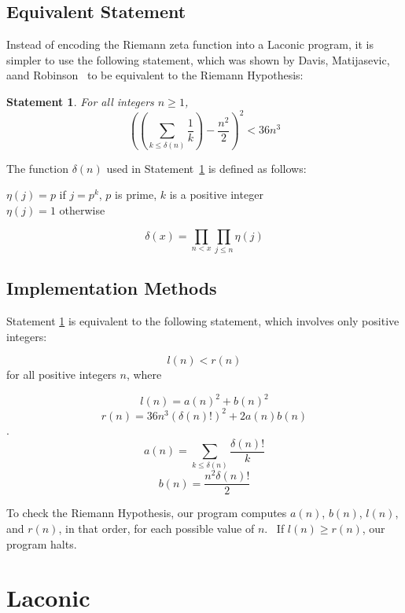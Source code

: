 \documentclass[11pt]{article}
\newtheorem{statement}{Statement}
\newenvironment{nscenter}
 {\parskip=0pt\par\nopagebreak\centering}
 {\par\noindent\ignorespacesafterend}
\begin{document}
\subsection{Equivalent Statement}

Instead of encoding the Riemann zeta function into a Laconic program, it is simpler to use the following statement, which was shown by Davis, Matijasevic, aand Robinson~\cite{riemann} to be equivalent to the Riemann Hypothesis:

\begin{statement} \label{eq:riemann}
For all integers $n \ge 1$,
$$\left(\left(\sum_{k \le \delta(n)} \frac{1}{k}\right) - \frac{n^2}{2}\right)^2 < 36n^3$$
\end{statement}

The function $\delta(n)$ used in Statement~\ref{eq:riemann} is defined as follows: \\

\begin{nscenter}
$\eta(j) = p$ if $j = p^k$, $p$ is prime, $k$ is a positive integer \\
$\eta(j) = 1$ otherwise
\end{nscenter}
$$\delta(x) = \prod_{n<x}\prod_{j \le n} \eta(j)$$

\subsection{Implementation Methods}

Statement \ref{eq:riemann} is equivalent to the following statement, which involves only positive integers\footnotemark:

$$l(n) < r(n)$$ for all positive integers $n$, where

$$l(n) = a(n)^2 + b(n)^2$$
$$r(n) = 36n^3(\delta(n)!)^2 + 2a(n)b(n)$$.
$$a(n) = \sum_{k \le \delta(n)} \frac{\delta(n)!}{k}$$
$$b(n) = \frac{n^2 \delta(n)!}{2}$$

To check the Riemann Hypothesis, our program computes $a(n)$, $b(n)$, $l(n)$, and $r(n)$, in that order, for each possible value of $n$. \ If $l(n) \ge r(n)$, our program halts.

\section{Laconic}
\end{document}
